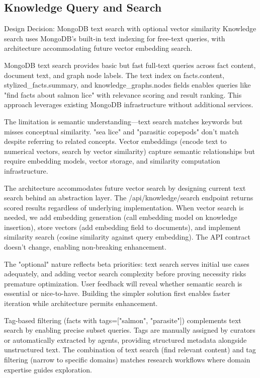 \documentclass[12pt,a4paper]{article}
\begin{document}
\subsection{Knowledge Query and Search}

\begin{rationale}{Design Decision: MongoDB text search with optional vector similarity}
Knowledge search uses MongoDB's built-in text indexing for free-text queries, with architecture accommodating future vector embedding search.
\end{rationale}

MongoDB text search provides basic but fast full-text queries across fact content, document text, and graph node labels. The text index on facts.content, stylized\_facts.summary, and knowledge\_graphs.nodes fields enables queries like "find facts about salmon lice" with relevance scoring and result ranking. This approach leverages existing MongoDB infrastructure without additional services.

The limitation is semantic understanding—text search matches keywords but misses conceptual similarity. "sea lice" and "parasitic copepods" don't match despite referring to related concepts. Vector embeddings (encode text to numerical vectors, search by vector similarity) capture semantic relationships but require embedding models, vector storage, and similarity computation infrastructure.

The architecture accommodates future vector search by designing current text search behind an abstraction layer. The /api/knowledge/search endpoint returns scored results regardless of underlying implementation. When vector search is needed, we add embedding generation (call embedding model on knowledge insertion), store vectors (add embedding field to documents), and implement similarity search (cosine similarity against query embedding). The API contract doesn't change, enabling non-breaking enhancement.

The "optional" nature reflects beta priorities: text search serves initial use cases adequately, and adding vector search complexity before proving necessity risks premature optimization. User feedback will reveal whether semantic search is essential or nice-to-have. Building the simpler solution first enables faster iteration while architecture permits enhancement.

Tag-based filtering (facts with tags=["salmon", "parasite"]) complements text search by enabling precise subset queries. Tags are manually assigned by curators or automatically extracted by agents, providing structured metadata alongside unstructured text. The combination of text search (find relevant content) and tag filtering (narrow to specific domains) matches research workflows where domain expertise guides exploration.
\end{document}
